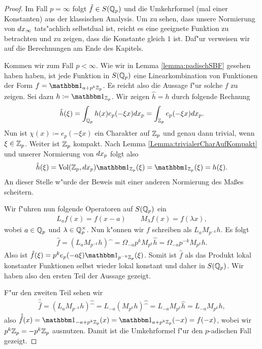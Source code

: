 		\begin{proof}
			Im Fall $p=\infty$ folgt $\hat{f} \in S({\mathbb{Q}_p})$ und die Umkehrformel (mal einer Konstanten) aus der klassischen Analysis.
			Um zu sehen, dass unsere Normierung von $d{x}_\infty$ tats"achlich selbstdual ist, reicht es eine geeignete Funktion zu betrachten und zu zeigen, dass die Konstante gleich $1$ ist. 
			Daf"ur verweisen wir auf die Berechnungen am Ende des Kapitels.
			
			Kommen wir zum Fall $p<\infty$. 
			Wie wir in Lemma \ref{lemma:padischSBF} gesehen haben haben, ist jede Funktion in $S({\mathbb{Q}_p})$ eine Linearkombination von Funktionen der Form $f = \ind_{a+p^k\Zp}$. 
			Es reicht also die Aussage f"ur solche $f$ zu zeigen.
			Sei dazu $h\coloneqq  \ind_{\Zp}$. Wir zeigen $\hat{h} = h$ durch folgende Rechnung
			\begin{align*}
				\hat{h}(\xi) = \int_{\mathbb{Q}_p} h(x) e_p (-\xi x) d{x}_p = \int_{\mathbb{Z}_p} e_p(-\xi x) d{x}_p.
			\end{align*}
			Nun ist $\chi(x)\coloneqq e_p(-\xi x)$ ein Charakter auf ${\mathbb{Z}_p}$ und genau dann trivial, wenn $\xi\in{\mathbb{Z}_p}$. 
			Weiter ist ${\mathbb{Z}_p}$ kompakt. 
			Nach Lemma \ref{Lemma:trivialerCharAufKompakt} und unserer Normierung von $d{x}_p$ folgt also
			\begin{align*}
				\hat{h}(\xi) = \Vol(\Zp, \dxp) \ind_\Zp(\xi) = \ind_\Zp(\xi) = h(\xi).
			\end{align*}
			An dieser Stelle w"urde der Beweis mit einer anderen Normierung des Maßes scheitern.
			
			Wir f"uhren nun folgende Operatoren auf $S({\mathbb{Q}_p})$ ein
			\begin{align*}
				L_a f(x) = f(x-a)\qquad M_\lambda f(x) = f(\lambda x),
			\end{align*}
			wobei $a \in {\mathbb{Q}_p}$ und $\lambda \in \mathbb{Q}_p^\times$. 
			Nun k"onnen wir $f$ schreiben als $L_a M_{p^{-k}}h$. 
			Es folgt
			\begin{align*}
				\hat{f} = (L_a M_{p^{-k}}h)\widehat{\phantom{x}} = \Omega_{-a}p^{k}M_{p^k}\hat{h}=\Omega_{-a}p^{-k}M_{p^k}h.
			\end{align*}
			Also ist $\hat{f} (\xi) = p^k e_p(-a\xi)\ind_{p^{-k}\Zp}(\xi)$. 
			Somit ist $\hat{f}$ als das Produkt lokal konstanter Funktionen selbst wieder lokal konstant und daher in $S({\mathbb{Q}_p})$. 
			Wir haben also den ersten Teil der Aussage gezeigt.
			
			F"ur den zweiten Teil sehen wir
			\begin{align*}
				\hat{\hat{f}} = (L_a M_{p^{-k}}h)\widehat{\widehat{\phantom{x}}} = L_{-a} (M_{p^k}h)\widehat{\widehat{\phantom{x}}}=L_{-a}M_{p^k}\hat{h} =L_{-a}M_{p^k}h,
			\end{align*}
			also $\hat{\hat{f}} (x) = \ind_{-a+p^k\Zp} (x) = \ind_{a+p^k\Zp} (-x) = f(-x)$, wobei wir $p^k{\mathbb{Z}_p} = - p^k{\mathbb{Z}_p}$ ausnutzen. 
			Damit ist die Umkehrformel f"ur den $p$-adischen Fall gezeigt. 
		\end{proof}
		
